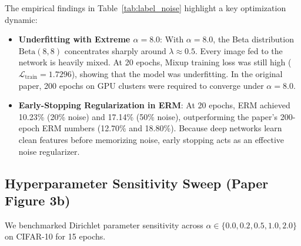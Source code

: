\documentclass[conference]{IEEEtran}
\begin{document}
The empirical findings in Table~\ref{tab:label_noise} highlight a key optimization dynamic:
\begin{itemize}
    \item \textbf{Underfitting with Extreme $\alpha=8.0$}: With $\alpha=8.0$, the Beta distribution $\text{Beta}(8, 8)$ concentrates sharply around $\lambda \approx 0.5$. Every image fed to the network is heavily mixed. At 20 epochs, Mixup training loss was still high ($\mathcal{L}_{\text{train}} = 1.7296$), showing that the model was underfitting. In the original paper, 200 epochs on GPU clusters were required to converge under $\alpha=8.0$.
    \item \textbf{Early-Stopping Regularization in ERM}: At 20 epochs, ERM achieved 10.23\% (20\% noise) and 17.14\% (50\% noise), outperforming the paper's 200-epoch ERM numbers (12.70\% and 18.80\%). Because deep networks learn clean features before memorizing noise, early stopping acts as an effective noise regularizer.
\end{itemize}

\subsection{Hyperparameter Sensitivity Sweep (Paper Figure 3b)}
We benchmarked Dirichlet parameter sensitivity across $\alpha \in \{0.0, 0.2, 0.5, 1.0, 2.0\}$ on CIFAR-10 for 15 epochs.

\begin{table}[htbp]
\caption{Mixup Hyperparameter Sensitivity Sweep ($\alpha$)}
\begin{center}
\label{tab:ablation}
\end{center}
\end{table}
\end{document}
